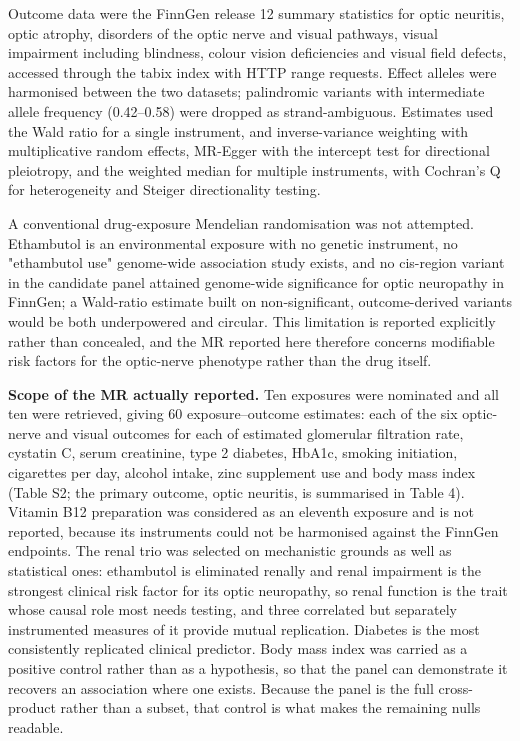 \documentclass[utf8]{FrontiersinVancouver}
\begin{document}
Outcome data were the FinnGen release 12 summary statistics for optic neuritis, optic atrophy, disorders of the optic nerve and visual pathways, visual impairment including blindness, colour vision deficiencies and visual field defects, accessed through the tabix index with HTTP range requests. Effect alleles were harmonised between the two datasets; palindromic variants with intermediate allele frequency (0.42--0.58) were dropped as strand-ambiguous. Estimates used the Wald ratio for a single instrument, and inverse-variance weighting with multiplicative random effects, MR-Egger with the intercept test for directional pleiotropy, and the weighted median for multiple instruments, with Cochran's Q for heterogeneity and Steiger directionality testing.

A conventional drug-exposure Mendelian randomisation was not attempted. Ethambutol is an environmental exposure with no genetic instrument, no "ethambutol use" genome-wide association study exists, and no cis-region variant in the candidate panel attained genome-wide significance for optic neuropathy in FinnGen; a Wald-ratio estimate built on non-significant, outcome-derived variants would be both underpowered and circular. This limitation is reported explicitly rather than concealed, and the MR reported here therefore concerns modifiable risk factors for the optic-nerve phenotype rather than the drug itself.

\textbf{Scope of the MR actually reported.} Ten exposures were nominated and all ten were retrieved, giving 60 exposure--outcome estimates: each of the six optic-nerve and visual outcomes for each of estimated glomerular filtration rate, cystatin C, serum creatinine, type 2 diabetes, HbA1c, smoking initiation, cigarettes per day, alcohol intake, zinc supplement use and body mass index (Table S2; the primary outcome, optic neuritis, is summarised in Table 4). Vitamin B12 preparation was considered as an eleventh exposure and is not reported, because its instruments could not be harmonised against the FinnGen endpoints. The renal trio was selected on mechanistic grounds as well as statistical ones: ethambutol is eliminated renally and renal impairment is the strongest clinical risk factor for its optic neuropathy, so renal function is the trait whose causal role most needs testing, and three correlated but separately instrumented measures of it provide mutual replication. Diabetes is the most consistently replicated clinical predictor. Body mass index was carried as a positive control rather than as a hypothesis, so that the panel can demonstrate it recovers an association where one exists. Because the panel is the full cross-product rather than a subset, that control is what makes the remaining nulls readable.
\end{document}
